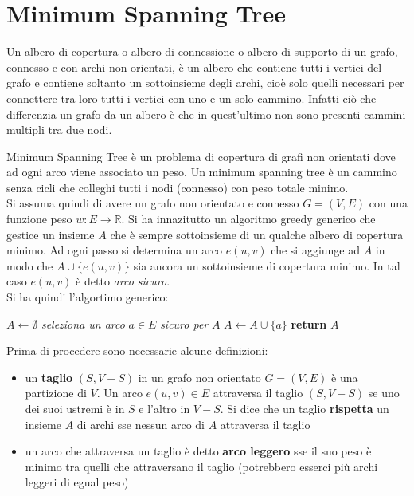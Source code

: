\documentclass[a4paper,12pt, oneside]{book}
\begin{document}
\chapter{Minimum Spanning Tree}
\begin{definizione}
  Un albero di copertura o albero di connessione o albero di supporto
  di un grafo, connesso e con archi non orientati, è un albero che
  contiene tutti i vertici del grafo e contiene soltanto un
  sottoinsieme degli archi, cioè solo quelli necessari per connettere
  tra loro tutti i vertici con uno e un solo cammino. Infatti ciò che
  differenzia un grafo da un albero è che in quest'ultimo non sono
  presenti cammini multipli tra due nodi.
\end{definizione}
Minimum Spanning Tree è un problema di copertura di grafi non
orientati dove ad ogni arco viene associato un peso. Un minimum
spanning tree è un cammino senza cicli che colleghi tutti i nodi
(connesso) con peso totale minimo.\\
Si assuma quindi di avere un grafo non orientato e connesso $G=(V,E)$
con una funzione peso $w:E\to\mathbb{R}$. Si ha innazitutto un
algoritmo greedy generico che gestice un insieme $A$ che è sempre
sottoinsieme di un qualche albero di copertura minimo. Ad ogni passo
si determina un arco $e(u,v)$ che si aggiunge ad $A$ in modo che
$A\cup\{e(u,v)\}$ sia ancora un sottoinsieme di copertura minimo. In
tal caso $e(u,v)$ è detto \textit{arco sicuro}.\\
Si ha quindi l'algortimo generico:
\begin{algorithm}[H]
  \begin{algorithmic}
    \State $A\gets \emptyset$
    \State \textit{seleziona un arco} $a\in E$ \textit{sicuro per} $A$
    \State $A\gets A\cup \{a\}$
    \EndWhile
    \State \textbf{return} $A$
    \EndFunction
  \end{algorithmic}

\end{algorithm}
Prima di procedere sono necessarie alcune definizioni:
\begin{itemize}
  \item un \textbf{taglio} $(S,V-S)$ in un grafo non orientato
  $G=(V,E)$ è una partizione di $V$. Un arco $e(u,v)\in E$ attraversa
  il taglio $(S,V-S)$ se uno dei suoi ustremi è in $S$ e l'altro in
  $V-S$. Si dice che un taglio \textbf{rispetta} un insieme $A$ di
  archi sse nessun arco di $A$ attraversa il taglio
  \item un arco che attraversa un taglio è detto \textbf{arco leggero}
  sse il suo peso è minimo tra quelli che attraversano il taglio
  (potrebbero esserci più archi leggeri di egual peso)
\end{itemize}
\end{document}
